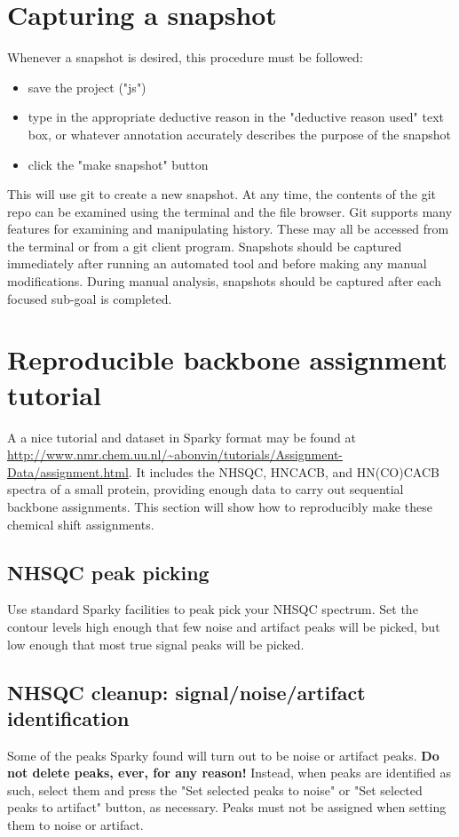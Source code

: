 \section{Capturing a snapshot}
Whenever a snapshot is desired, this procedure must be followed:
\begin{itemize}
  \item save the project ("js")
  \item type in the appropriate deductive reason in the "deductive reason used"
    text box, or whatever annotation accurately describes the purpose of the 
    snapshot
  \item click the "make snapshot" button
\end{itemize}
This will use git to create a new snapshot.  At any time, the contents of
the git repo can be examined using the terminal and the file browser.  Git
supports many features for examining and manipulating history.  These may
all be accessed from the terminal or from a git client program.
Snapshots should be captured immediately after running an automated tool and 
before making any manual modifications.  During manual analysis, snapshots 
should be captured after each focused sub-goal is completed.



\section{Reproducible backbone assignment tutorial}
A a nice tutorial and dataset in Sparky format may be found at 
\url{http://www.nmr.chem.uu.nl/~abonvin/tutorials/Assignment-Data/assignment.html}.
It includes the NHSQC, HNCACB, and HN(CO)CACB spectra of a small protein,
providing enough data to carry out sequential backbone assignments.
This section will show how to reproducibly make these chemical shift
assignments.

\subsection*{NHSQC peak picking}
Use standard Sparky facilities to peak pick your NHSQC spectrum.
Set the contour levels high enough that few noise and 
artifact peaks will be picked, but low enough that most true signal peaks
will be picked.

\subsection*{NHSQC cleanup: signal/noise/artifact identification}
Some of the peaks Sparky found will turn out to be noise or artifact peaks.
\textbf{Do not delete peaks, ever, for any reason!}  Instead,
when peaks are identified as such, select them and press the "Set selected 
peaks to noise" or "Set selected peaks to artifact" button, as necessary.
Peaks must not be assigned when setting them to noise or artifact.

